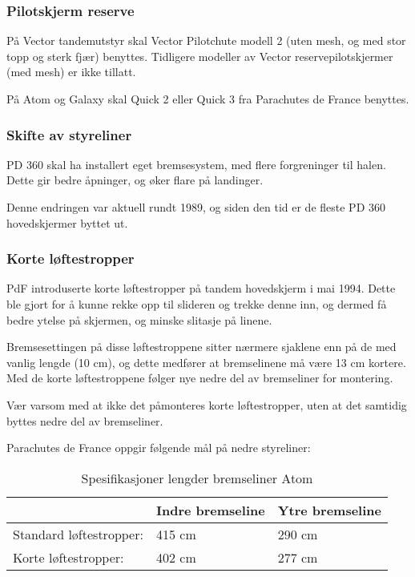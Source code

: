 \subsubsection{Pilotskjerm reserve}
På Vector tandemutstyr skal Vector Pilotchute modell 2 (uten mesh, og med stor topp og sterk fjær) benyttes. Tidligere modeller av Vector reservepilotskjermer (med mesh) er ikke tillatt.

På Atom og Galaxy skal Quick 2 eller Quick 3 fra Parachutes de France benyttes.

\subsubsection{Skifte av styreliner}
PD 360 skal ha installert eget bremsesystem, med flere forgreninger til halen. Dette gir bedre åpninger, og øker flare på landinger.

Denne endringen var aktuell rundt 1989, og siden den tid er de fleste PD 360 hovedskjermer byttet ut.

\subsubsection{Korte løftestropper}
PdF introduserte korte løftestropper på tandem hovedskjerm i mai 1994. Dette ble gjort for å kunne rekke opp til slideren og trekke denne inn, og dermed få bedre ytelse på skjermen, og minske slitasje på linene.

Bremsesettingen på disse løftestroppene sitter nærmere sjaklene enn på de med vanlig lengde (10 cm), og dette medfører at bremselinene må være 13 cm kortere. Med de korte løftestroppene følger nye nedre del av bremseliner for montering.

Vær varsom med at ikke det påmonteres korte løftestropper, uten at det samtidig byttes nedre del av bremseliner.

Parachutes de France oppgir følgende mål på nedre styreliner:
\begin{table}
	\caption{Spesifikasjoner lengder bremseliner Atom}
	\begin{tabular}{ | l | l | l | }
		\hline
		& Indre bremseline & Ytre bremseline \\
		\hline
		Standard løftestropper: & 415 cm & 290 cm \\
		\hline
		Korte løftestropper: & 402 cm & 277 cm \\
		\hline
	\end{tabular}
\end{table}

